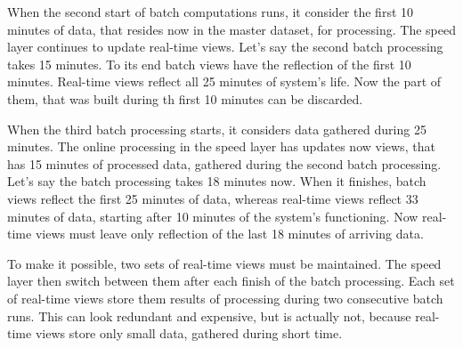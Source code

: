 When the second start of batch computations runs, it consider the first 10 minutes of data, that resides now in the master dataset, for processing.
The speed layer continues to update real-time views.
Let's say the second batch processing takes 15 minutes.
To its end batch views have the reflection of the first 10 minutes.
Real-time views reflect all 25 minutes of system's life.
Now the part of them, that was built during th first 10 minutes can be discarded.

When the third batch processing starts, it considers data gathered during 25 minutes.
The online processing in the speed layer has updates now views, that has 15 minutes of processed data, gathered during the second batch processing.
Let's say the batch processing takes 18 minutes now.
When it finishes, batch views reflect the first 25 minutes of data, whereas real-time views reflect 33 minutes of data, starting after 10 minutes of the system's functioning.
Now real-time views must leave only reflection of the last 18 minutes of arriving data.

To make it possible, two sets of real-time views must be maintained.
The speed layer then switch between them after each finish of the batch processing.
Each set of real-time views store them results of processing during two consecutive batch runs.
This can look redundant and expensive, but is actually not, because real-time views store only small data, gathered during short time.
